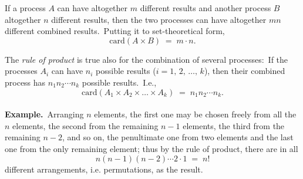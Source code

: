 \documentclass[12pt]{article}
\theoremstyle{definition}
\begin{document}

If a process $A$ can have altogether $m$ different results and another process $B$ altogether $n$ different results, then the two processes can have altogether $mn$ different combined results.\, Putting it to set-theoretical form,
$$\mbox{card}(A\!\times\!B) \;=\; m\!\cdot\!n.$$

The \emph{rule of product} is true also for the combination of several processes:\, If the processes $A_i$ can have $n_i$ possible results ($i = 1,\,2,\,\ldots,\,k$), then their combined process has $n_1n_2\!\cdots\!n_k$ possible results.\, I.e.,
$$\mbox{card}(A_1\!\times\!A_2\!\times\ldots\times\!A_k) \;=\; n_1n_2\!\cdots\!n_k.$$\\


\textbf{Example.}\, Arranging $n$ elements, the first one may be chosen freely from all the $n$ elements, the second from the remaining $n\!-\!1$ elements, the third from the remaining $n\!-\!2$, and so on, the penultimate one from two elements and the last one from the only remaining element; thus by the rule of product, there are in all 
$$n(n\!-\!1)(n\!-\!2)\!\cdots\!2\!\cdot\!1 \;=\; n!$$ 
different arrangements, i.e. permutations, as the result.
\end{document}
